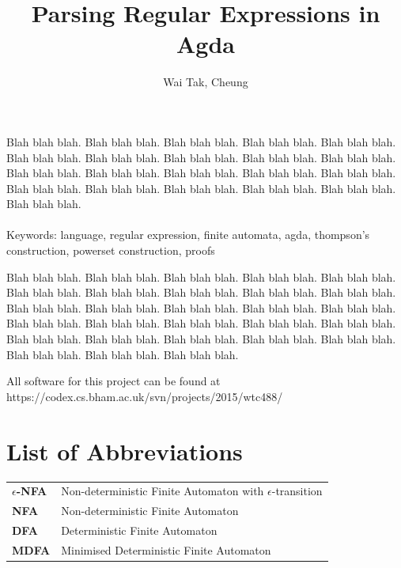 \documentclass[twoside,openright,final]{bhamthesis}
\title{\textbf{Parsing Regular Expressions in Agda}}
\author{Wai Tak, Cheung}
\begin{document}
\maketitle

\abstract
\par Blah blah blah. Blah blah blah. Blah blah blah. Blah blah blah. Blah
blah blah. Blah blah blah. Blah blah blah. Blah blah blah.
Blah blah blah. Blah blah blah. Blah blah blah. Blah blah blah. Blah
blah blah.
Blah blah blah. Blah blah blah. Blah blah blah. Blah blah blah.
Blah blah blah. Blah blah blah. Blah blah blah. Blah blah blah. \\ \\
Keywords: language, regular expression, finite automata, agda,
thompson's construction, powerset construction, proofs

\acknowledgments
\par Blah blah blah. Blah blah blah. Blah blah blah. Blah blah blah. Blah
blah blah. Blah blah blah. Blah blah blah.
Blah blah blah. Blah blah blah. Blah blah blah.
Blah blah blah. Blah blah blah. Blah blah blah. Blah blah blah. Blah
blah blah. Blah blah blah. Blah blah blah.
Blah blah blah. Blah blah blah. Blah blah blah. Blah blah blah. Blah
blah blah. Blah blah blah.
Blah blah blah. Blah blah blah. Blah blah blah. Blah blah blah. Blah
blah blah.

\repository
\vspace{7cm}
\begin{center}
  All software for this project can be found at \\
  https://codex.cs.bham.ac.uk/svn/projects/2015/wtc488/
\end{center}

\newpage
\section*{List of Abbreviations}
\begin{tabular}{ll}
  \textbf{\(\epsilon\)-NFA} & Non-deterministic Finite Automaton with
                              \(\epsilon\)-transition \\
  \textbf{NFA} & Non-deterministic Finite Automaton \\
  \textbf{DFA} & Deterministic Finite Automaton \\
  \textbf{MDFA} & Minimised Deterministic Finite Automaton
\end{tabular}
\newpage

\newpage
\setcounter{tocdepth}{3}
\tableofcontents
\newpage
\end{document}
